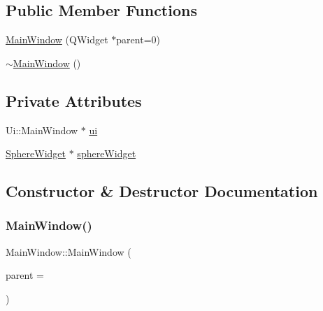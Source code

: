 \subsection*{Public Member Functions}
\begin{DoxyCompactItemize}
\item 
\hyperlink{class_main_window_a8b244be8b7b7db1b08de2a2acb9409db}{Main\+Window} (Q\+Widget $\ast$parent=0)
\item 
\hyperlink{class_main_window_ae98d00a93bc118200eeef9f9bba1dba7}{$\sim$\+Main\+Window} ()
\end{DoxyCompactItemize}
\subsection*{Private Attributes}
\begin{DoxyCompactItemize}
\item 
Ui\+::\+Main\+Window $\ast$ \hyperlink{class_main_window_a35466a70ed47252a0191168126a352a5}{ui}
\item 
\hyperlink{class_sphere_widget}{Sphere\+Widget} $\ast$ \hyperlink{class_main_window_afc60f18ae3cf60a9c231d8344a5bbda8}{sphere\+Widget}
\end{DoxyCompactItemize}


\subsection{Constructor \& Destructor Documentation}
\mbox{\label{class_main_window_a8b244be8b7b7db1b08de2a2acb9409db}} 
\subsubsection{\texorpdfstring{Main\+Window()}{MainWindow()}}
{\footnotesize\ttfamily Main\+Window\+::\+Main\+Window (\begin{DoxyParamCaption}\item[{Q\+Widget $\ast$}]{parent = {} }\end{DoxyParamCaption})\hspace{0.3cm}{\ttfamily [explicit]}}

\mbox{\label{class_main_window_ae98d00a93bc118200eeef9f9bba1dba7}} 
